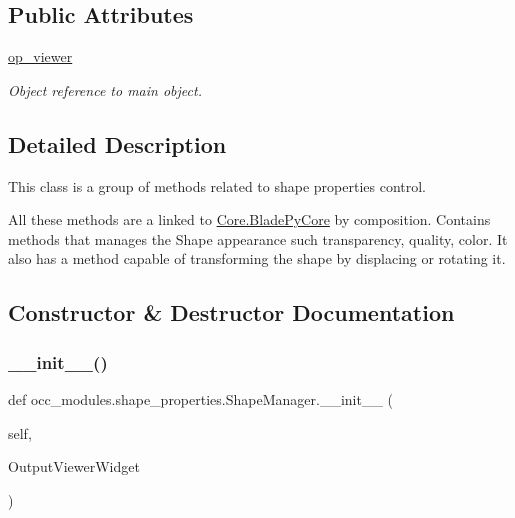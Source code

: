 \subsection*{Public Attributes}
\begin{DoxyCompactItemize}
\item 
\hyperlink{classocc__modules_1_1shape__properties_1_1_shape_manager_ad60197d66a3c059f30f32c2ab1a12841}{op\+\_\+viewer}
\begin{DoxyCompactList}\small\item\em Object reference to main object. \end{DoxyCompactList}\end{DoxyCompactItemize}


\subsection{Detailed Description}
This class is a group of methods related to shape properties control. 

All these methods are a linked to \hyperlink{class_core_1_1_blade_py_core}{Core.\+Blade\+Py\+Core} by composition. Contains methods that manages the Shape appearance such transparency, quality, color. It also has a method capable of transforming the shape by displacing or rotating it. 

\subsection{Constructor \& Destructor Documentation}
\hypertarget{classocc__modules_1_1shape__properties_1_1_shape_manager_aeafd1ea7cbe63a409e51e546db403bfd}{}\label{classocc__modules_1_1shape__properties_1_1_shape_manager_aeafd1ea7cbe63a409e51e546db403bfd} 
\subsubsection{\texorpdfstring{\+\_\+\+\_\+init\+\_\+\+\_\+()}{\_\_init\_\_()}}
{\footnotesize\ttfamily def occ\+\_\+modules.\+shape\+\_\+properties.\+Shape\+Manager.\+\_\+\+\_\+init\+\_\+\+\_\+ (\begin{DoxyParamCaption}\item[{}]{self,  }\item[{}]{Output\+Viewer\+Widget }\end{DoxyParamCaption})}




